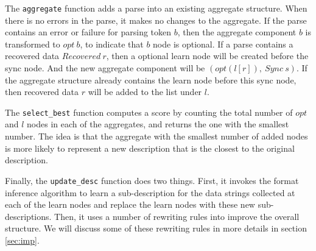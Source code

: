 {The {\tt aggregate} function adds a parse into an existing aggregate structure. When there is
no errors in the parse, it makes no changes to the aggregate. If the parse contains 
an error or failure for parsing token $b$, then the aggregate component 
$b$ is transformed to $opt~ b$, to indicate that $b$ node is optional. 
If a parse contains a recovered data $Recovered~ r$, then
a optional learn node will be created before the sync node. And the new aggregate component will be
$(opt (l [r]),~ Sync~ s)$. If the aggregate structure already contains the learn node before this
sync node, then recovered data $r$ will be added to the list under $l$.

The {\tt select\_best} function computes a score by counting the total number of $opt$ and $l$ nodes
in each of the aggregates, and returns the one with the smallest number. The idea is that the
aggregate with the smallest number of added nodes is more likely to represent a new description
that is the closest to the original description. 

Finally, the {\tt update\_desc} function does two things. First, it invokes the format inference
algorithm to learn a sub-description for the data strings collected at each of the learn nodes
and replace the learn nodes with these new sub-descriptions. Then, it uses a number of rewriting
rules into improve the overall structure. We will discuss some of these rewriting rules in more
details in section \ref{sec:imp}.

}%


